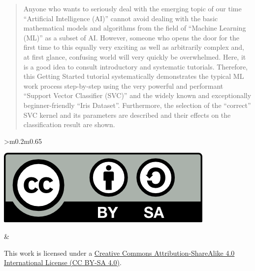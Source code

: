 \documentclass [oneside,10pt,a4paper,ngerman,BCOR10mm,headsepline,parindent,final]{scrartcl}
\begin{document}
    \begin{abstract}
    Anyone who wants to seriously deal with the emerging topic of our time ``Artificial Intelligence (AI)'' cannot avoid dealing with the basic mathematical models and algorithms from the field of ``Machine Learning (ML)'' as a subset of AI. However, someone who opens the door for the first time to this equally very exciting as well as arbitrarily complex and, at first glance, confusing world will very quickly be overwhelmed. Here, it is a good idea to consult introductory and systematic tutorials. Therefore, this Getting Started tutorial systematically demonstrates the typical ML work process step-by-step using the very powerful and performant ``Support Vector Classifier (SVC)'' and the widely known and exceptionally beginner-friendly ``Iris Dataset''. Furthermore, the selection of the ``correct'' SVC kernel and its parameters are described and their effects on the classification result are shown.
    \end{abstract}
    \vfill\noindent
    \begin{center}
	    \begin{tabular}{>{\centering}m{0.2\textwidth}m{0.65\textwidth}}
	    \begin{minipage}{\linewidth}
	        \includegraphics{images/CC_BY-SA_40.png}
	    \end{minipage}
	    &
	    \begin{minipage}{\linewidth}
	        This work is licensed under a \href{https://creativecommons.org/licenses/by-sa/4.0/}{Creative Commons Attribution-ShareAlike 4.0 International License (CC BY-SA 4.0)}.
	    \end{minipage}
	    \end{tabular}
	\end{center}

    \newpage

    \pagestyle{fancy}
    \fancyhf{}
    \fancyhead[ER,OR]{\leftmark}
\end{document}
